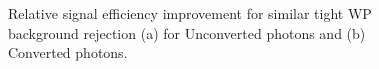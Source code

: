 \begin{figure}[htbp]
    \centering
	\begin{tcolorbox}[colback=black!5!white,colframe=white!75!black]
    \caption{Relative signal efficiency improvement for similar tight WP background rejection (a) for Unconverted photons and (b) Converted photons.}
    \label{fig:gamma:CNN:Validation:Imp}
    \end{tcolorbox}
    
\end{figure}

